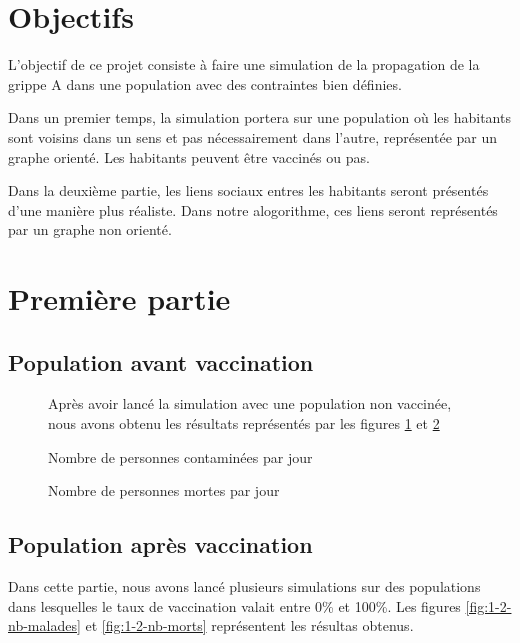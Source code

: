 \documentclass[12pt,a4paper,titlepage]{report}
\begin{document}

{}
\renewcommand\headrulewidth{2pt}


\section*{Objectifs}
\thispagestyle{fancy}
\par L'objectif de ce projet consiste à faire une simulation de la propagation de la grippe A dans une population avec des contraintes bien définies. 
\par Dans un premier temps, la simulation portera sur une population où les habitants sont voisins dans un sens et pas nécessairement dans l'autre, représentée par un graphe orienté. Les habitants peuvent être vaccinés ou pas. 
\par Dans la deuxième partie, les liens sociaux entres les habitants seront présentés d'une manière plus réaliste. Dans notre alogorithme, ces liens seront représentés par un graphe non orienté.


\section*{Première partie}
\subsection*{Population avant vaccination}
\begin{figure}[h]
Après avoir lancé la simulation avec une population non vaccinée, nous avons obtenu 
les résultats représentés par les figures \ref{fig:1-1-nb-malades} et \ref{fig:1-1-nb-morts}   
  \centering
  \caption{Nombre de personnes contaminées par jour}
  \label{fig:1-1-nb-malades}
\end{figure}

\begin{figure}[h]
  \centering
  \caption{Nombre de personnes mortes par jour}
  \label{fig:1-1-nb-morts}
\end{figure}

\subsection*{Population après vaccination}
Dans cette partie, nous avons lancé plusieurs simulations sur des populations dans 
lesquelles  le taux de vaccination valait entre 0\% et 100\%. Les figures  \ref{fig:1-2-nb-malades} 
et \ref{fig:1-2-nb-morts} représentent les résultas obtenus.
\end{document}
